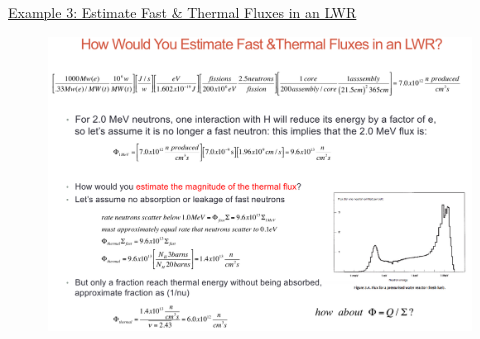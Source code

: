 \documentclass{school-22.211-notes}
\begin{document}
\uline{Example 3: Estimate Fast \& Thermal Fluxes in an LWR}
\begin{figure}[ht]
  \centering
  \includegraphics[width=4.5in]{images/lec1-example3.png}
\end{figure}

\clearpage
{}


\end{document}

